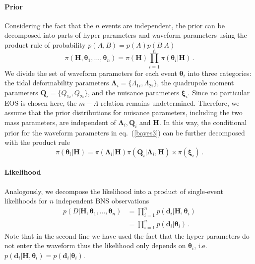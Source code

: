 \documentclass[a4paper,11pt]{article}
\begin{document}
\paragraph{Prior}
Considering the fact that the $n$ events are independent, the prior can be decomposed into parts of hyper parameters 
and waveform parameters using the product rule of probability $p(A,B)=p(A)p(B|A)$
\begin{equation}
\label{bayes3}
\pi(\bm{H},\bm{\theta}_1,...,\bm{\theta}_n) = \pi(\bm{H}) \prod_{i=1}^n \pi(\bm{\theta}_i|\bm{H})\,.
\end{equation}
We divide the set of waveform parameters for each event $\bm{\theta}_i$ into three categories: the tidal deformability 
parameters $\bm{\Lambda}_i=\{\Lambda_{1i},\Lambda_{2i}\}$, the quadrupole moment parameters $\bm{Q}_i=\{Q_{1i},Q_{2i}\}$, 
and the nuisance parameters $\bm{\xi}_i$. Since no particular EOS is chosen here, the $m-\Lambda$ relation remains undetermined. 
Therefore, we assume that the prior distributions for nuisance parameters, including the two mass parameters, 
are independent of $\bm{\Lambda}_i, \bm{Q}_i$ and $\bm{H}$. In this way, the conditional prior for the waveform parameters 
in eq.~(\ref{bayes3}) can be further decomposed with the product rule
\begin{equation}
\label{prior}
\pi(\bm{\theta}_i|\bm{H})=\pi(\bm{\Lambda}_i|\bm{H})\pi(\bm{Q}_i|\bm{\Lambda}_i,\bm{H})\times\pi(\bm{\xi}_i)\,.
\end{equation}

\paragraph{Likelihood}
Analogously, we decompose the likelihood into a product of single-event likelihoods for $n$ independent BNS observations
\begin{subequations}
\begin{align}
p(D|\bm{H},\bm{\theta}_1,...,\bm{\theta}_n)&=\prod_{i=1}^{n}p(\bm{d}_i|\bm{H},\bm{\theta}_i)\\
&=\prod_{i=1}^{n}p(\bm{d}_i|\bm{\theta}_i)\,.
\end{align}   
\end{subequations}
Note that in the second line we have used the fact that the hyper parameters do not enter the waveform thus the likelihood 
only depends on $\bm{\theta}_i$, i.e. $p(\bm{d}_i|\bm{H},\bm{\theta}_i)=p(\bm{d}_i|\bm{\theta}_i)$.
\end{document}
